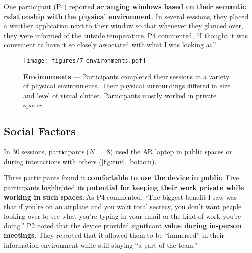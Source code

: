 One participant (P4) reported \textbf{arranging windows based on their semantic relationship with the physical environment}. 
In several sessions, they placed a weather application next to their window so that whenever they glanced over, they were informed of the outside temperature. 
P4 commented, ``I thought it was convenient to have it so closely associated with what I was looking at.''

\begin{figure*}
    \centering
    \texttt{[image: figures/7-environments.pdf]}
    \caption{\textbf{Environments} --- Participants completed their sessions in a variety of physical environments. Their physical surroundings differed in size and level of visual clutter. Participants mostly worked in private spaces.}
    \label{fig:env}
    \vspace{-1em}
\end{figure*}

\subsection{Social Factors}
\label{sec:social}
In 30 sessions, 
participants ($N$~=~8) used the AR laptop in public spaces or during interactions with others (\autoref{fig:env},~bottom).

Three participants
found it \textbf{comfortable to use the device in public}.
Five participants 
highlighted its \textbf{potential for keeping their work private while working in such spaces}. 
As P4 commented, ``The biggest benefit I saw was that if you're on an airplane and you want total secrecy, you don't want people looking over to see what you're typing in your email or the kind of work you're doing.'' 
P2 noted that the device provided significant \textbf{value during in-person meetings}. 
They reported that it allowed them to be ``immersed'' in their information environment while still staying ``a part of the team.''

